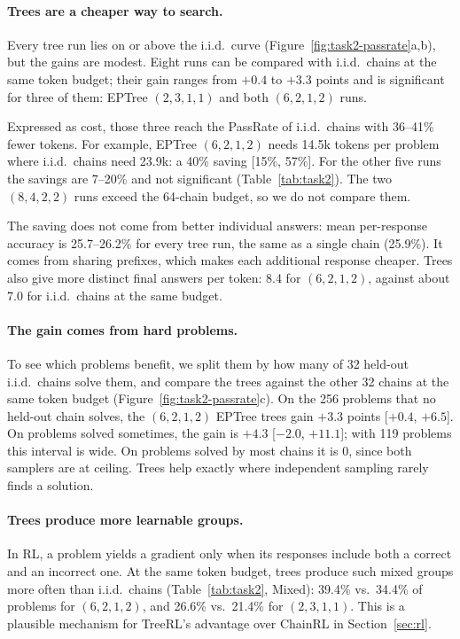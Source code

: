 \paragraph{Trees are a cheaper way to search.}
Every tree run lies on or above the i.i.d.\ curve (Figure~\ref{fig:task2-passrate}a,b), but the gains are modest. Eight runs can be compared with i.i.d.\ chains at the same token budget; their gain ranges from $+0.4$ to $+3.3$ points and is significant for three of them: EPTree $(2,3,1,1)$ and both $(6,2,1,2)$ runs.

Expressed as cost, those three reach the PassRate of i.i.d.\ chains with 36--41\% fewer tokens. For example, EPTree $(6,2,1,2)$ needs 14.5k tokens per problem where i.i.d.\ chains need 23.9k: a 40\% saving [15\%, 57\%]. For the other five runs the savings are 7--20\% and not significant (Table~\ref{tab:task2}). The two $(8,4,2,2)$ runs exceed the 64-chain budget, so we do not compare them.

The saving does not come from better individual answers: mean per-response accuracy is 25.7--26.2\% for every tree run, the same as a single chain (25.9\%). It comes from sharing prefixes, which makes each additional response cheaper. Trees also give more distinct final answers per token: 8.4 for $(6,2,1,2)$, against about 7.0 for i.i.d.\ chains at the same budget.

\paragraph{The gain comes from hard problems.}
To see which problems benefit, we split them by how many of 32 held-out i.i.d.\ chains solve them, and compare the trees against the other 32 chains at the same token budget (Figure~\ref{fig:task2-passrate}c). On the 256 problems that no held-out chain solves, the $(6,2,1,2)$ EPTree trees gain $+3.3$ points [$+0.4$, $+6.5$]. On problems solved sometimes, the gain is $+4.3$ [$-2.0$, $+11.1$]; with 119 problems this interval is wide. On problems solved by most chains it is 0, since both samplers are at ceiling. Trees help exactly where independent sampling rarely finds a solution.

\paragraph{Trees produce more learnable groups.}
In RL, a problem yields a gradient only when its responses include both a correct and an incorrect one. At the same token budget, trees produce such mixed groups more often than i.i.d.\ chains (Table~\ref{tab:task2}, Mixed): 39.4\% vs.\ 34.4\% of problems for $(6,2,1,2)$, and 26.6\% vs.\ 21.4\% for $(2,3,1,1)$. This is a plausible mechanism for TreeRL's advantage over ChainRL in Section~\ref{sec:rl}.

